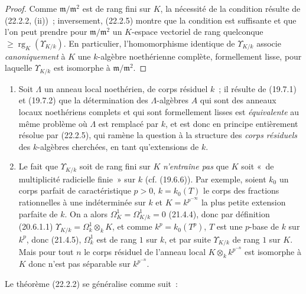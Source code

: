 \begin{proof}
Comme $\mathfrak m/\mathfrak m^2$ est de rang fini sur $K$, la nécessité de
la condition résulte de (22.2.2, (ii))~; inversement, (22.2.5) montre que la
condition est suffisante et que l'on peut prendre pour
$\mathfrak m/\mathfrak m^2$ un $K$-espace vectoriel de rang quelconque
$\geqslant\operatorname{rg}_K(\Upsilon_{K/k})$.
En particulier, l'homomorphisme identique de $\Upsilon_{K/k}$ associe
\emph{canoniquement} à $K$ une $k$-algèbre noethérienne complète,
formellement lisse, pour laquelle $\Upsilon_{K/k}$ est isomorphe à
$\mathfrak m/\mathfrak m^2$.
\end{proof}

\begin{remarks}[22.2.7]
\label{0.22.2.7-fr}
\begin{enumerate}
  \item[(i)] Soit $\Lambda$ un anneau local noethérien, de corps résiduel
  $k$~; il résulte de (19.7.1) et (19.7.2) que la détermination des
  $\Lambda$-algèbres $A$ qui sont des anneaux locaux noethériens complets et
  qui sont formellement lisses est \emph{équivalente} au même problème où
  $\Lambda$ est remplacé par $k$, et est donc en principe entièrement
  résolue par (22.2.5), qui ramène la question à la structure des \emph{corps
  résiduels} des $k$-algèbres cherchées, en tant qu'extensions de $k$.

  \item[(ii)] Le fait que $\Upsilon_{K/k}$ soit de rang fini sur $K$
  \emph{n'entraîne pas} que $K$ soit «~de multiplicité radicielle finie~» sur
  $k$ (cf. (19.6.6)). Par exemple, soient $k_0$ un corps parfait de
  caractéristique $p>0$, $k=k_0(T)$ le corps des fractions rationnelles à une
  indéterminée sur $k$ et $K=k^{p^{-\infty}}$ la plus petite extension
  parfaite de $k$. On a alors $\Omega^1_K=\Omega^1_{K/k}=0$ (21.4.4), donc
  par définition (20.6.1.1)
  $\Upsilon_{K/k}=\Omega^1_k\otimes_kK$, et comme $k^p=k_0(T^p)$, $T$ est
  une $p$-base de $k$ sur $k^p$, donc (21.4.5), $\Omega^1_k$ est de rang $1$
  sur $k$, et par suite $\Upsilon_{K/k}$ de rang $1$ sur $K$. Mais pour tout
  $n$ le corps résiduel de l'anneau local $K\otimes_kk^{p^{-n}}$ est
  isomorphe à $K$ donc n'est pas séparable sur $k^{p^{-n}}$.
\end{enumerate}
\end{remarks}

Le théorème (22.2.2) se généralise comme suit~:

